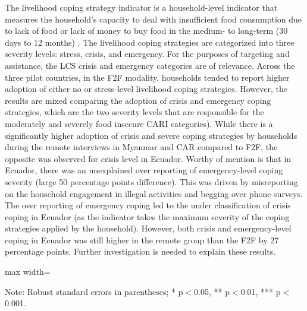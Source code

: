 \documentclass[11pt,harvard]{article}
\begin{document}
The livelihood coping strategy indicator is a household-level indicator that measures the household’s capacity to deal with insufficient food consumption due to lack of food or lack of money to buy food in the medium- to long-term  (30 days to 12 months) . The livelihood coping strategies are categorized into three severity levels: stress, crisis, and emergency. For the purposes of targeting and assistance, the LCS crisis and emergency categories are of relevance. 
Across the three pilot countries, in the F2F modality, households tended to report higher adoption of either no or stress-level livelihood coping strategies. However, the results are mixed comparing the adoption of crisis and emergency coping strategies, which are the two severity levels that are responsible for the moderately and severely food insecure CARI categories). While there is a significantly higher adoption of crisis and severe coping strategies by households during the remote interviews in Myanmar and CAR compared to F2F, the opposite was observed for crisis level in Ecuador.  Worthy of mention is that in Ecuador, there was an unexplained over reporting of emergency-level coping severity (large 50 percentage points difference). This was driven by misreporting on the household engagement in illegal activities and begging over phone surveys. The over reporting of emergency coping led to the under classification of crisis coping in Ecuador (as the indicator takes the maximum severity of the coping strategies applied by the household). However, both crisis and emergency-level coping in Ecuador was still higher in the remote group than the F2F by 27 percentage points. Further investigation is needed to explain these results.
	
	\begin{table}[htbp]
		\centering
		\begin{adjustbox}{max width=\textwidth}
			\begin{threeparttable}
				\caption{Impact of Survey Modality on Livelihood Coping Strategy Index}
				\scriptsize
				 
				\label{tab:LCS_Modality_All_Country}
				\begin{tablenotes}
					\item Note: Robust standard errors in parentheses; * p$<$0.05, ** p$<$0.01, *** p$<$0.001. 
				\end{tablenotes}
			\end{threeparttable}
		\end{adjustbox}
	\end{table}
	
\end{document}
